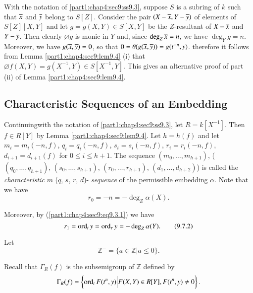 \begin{remark}\label{part1:chap4:sec9:rem9.6}
  With the notation of \ref{part1:chap4:sec9:ss9.3}, suppose $S$ is a subring of $k$ such that $\overline{x}$ and $\overline{y}$ belong to $S[Z]$. Consider the pair $(X- \overline{x}, Y-\overline{y})$ of elements of $S[Z][X, Y]$ and let $g= g(X, Y) \in S [X, Y]$ be the $Z$-resultant of $X - \overline{x}$ and $Y- \overline{y}$. Then clearly $\diameter g$ is monic in $Y$ and, since $\deg_Z \overline{x}=n$, we have $\deg_Y g=n$. Moreover, we have $g (\overline{x}, \overline{y})=0$, so that $0 = \theta (g (\overline{x}, \overline{y}))= g(t^{-n}, y)$. therefore it follows from Lemma \ref{part1:chap4:sec9:lem9.4} (i) that $\diameter f (X, Y)= g(X^{-1}, Y) \in S [X^{-1}, Y]$. This gives an alternative proof of part (ii) of Lemma \ref{part1:chap4:sec9:lem9.4}.
\end{remark}

\setcounter{subsection}{6}
\subsection{Characteristic Sequences of an  Embedding}\label{part1:chap4:sec9:ss9.7}
Continuing\pageoriginale with the notation of
\ref{part1:chap4:sec9:ss9.3}, let $R= k[X^{-1}]$. Then $f \in R [Y]$
by Lemma \ref{part1:chap4:sec9:lem9.4}. Let $h= h(f)$ and let $m_i=
m_i (-n, f)$, $q_i = q_i (-n, f)$, $s_i = s_i(-n, f)$, $r_i= r_i(-n ,
f)$, $d_{i+1}= d_{i+1}(f)$ for $0 \leq i \leq h+1$. The sequence
$(m_0, \ldots , m_{h+1})$, (\resp $(q_0 , \ldots , q_{h+1})$, \resp
$(s_0, \ldots , s_{h+1})$, \resp $(r_0, \ldots , r_{h+1})$,
\resp\break 
$(d_1, \ldots , d_{h+2})$) is called the {\em characteristic} $m$
(\resp $q$, \resp $s$, \resp $r$, \resp $d$)- {\em sequence} of the
permissible embedding $\alpha$. Note that we have 
\begin{equation*}
  r_0 =- n= - \deg_Z \alpha (X). \tag{9.7.1} \label{part1:chap4:sec9:eq9.7.1}
\end{equation*}

Moreover, by (\ref{part1:chap4:sec9:eq9.3.1}) we have
\begin{equation*}
  r_1 = \operatorname{ord}_t y= \operatorname{ord}_\tau y =- \deg_Z \alpha (Y). \tag{9.7.2} \label{part1:chap4:sec9:eq9.7.2}
\end{equation*}

Let
$$
\mathbb{Z}^- = \{ a \in \mathbb{Z} \big| a \leq 0 \}.
$$

Recall that $\Gamma_R (f)$ is the subsemigroup of $\mathbb{Z}$ defined by 
$$
\Gamma_R (f)= \left\{ \operatorname{ord}_t F (t^n, y) \Big| F(X, Y) \in R [Y], F(t^n, y) \neq 0 \right\}.
$$

